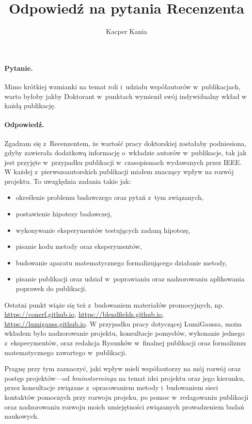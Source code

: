 \documentclass{rebuttal}
\title{Odpowiedź na pytania Recenzenta}
\author{Kacper Kania}
\date{}
\begin{document}
\maketitle

\responsedelimiter

\paragraph{Pytanie.}
  Mimo krótkiej wzmianki na temat roli i~udziału współautorów w~publikacjach,
  warto byłoby jakby Doktorant w~punktach wymienił swój indywidualny wkład w
  każdą publikację.
\paragraph{Odpowiedź.}
  Zgadzam się z~Recenzentem, że wartość pracy doktorskiej zostałaby podniesiona,
  gdyby zawierała dodatkową informację o~wkładzie autorów w~publikacje, tak jak
  jest przyjęte w~przypadku publikacji w~czasopismach wydawanych przez IEEE. W
  każdej z~pierwszoautorskich publikacji miałem znaczący wpływ na rozwój
  projektu. To uwzględnia zadania takie jak:
  \begin{itemize}
    \item określenie problemu badawczego oraz pytań z~tym związanych,
    \item postawienie hipotezy badawczej,
    \item wykonywanie eksperymentów testujących zadaną hipotezę,
    \item pisanie kodu metody oraz eksperymentów,
    \item budowanie aparatu matematycznego formalizującego działanie metody,
    \item pisanie publikacji oraz udział w~poprawianiu oraz nadzorowaniu aplikowania
          poprawek do publikacji.
  \end{itemize}
  Ostatni punkt wiąże się też z~budowaniem
  materiałów promocyjnych, np. \url{https://conerf.github.io},
  \url{https://blendfields.github.io}, \url{https://lumigauss.github.io}. W
  przypadku pracy dotyczącej LumiGaussa, moim wkładem było nadzorowanie
  projektu, konsultacje pomysłów, wykonanie jednego z~eksperymentów, oraz
  redakcja Rysunków w~finalnej publikacji oraz formalizmu matematycznego
  zawartego w~publikacji.

  Pragnę przy tym zaznaczyć, jaki wpływ mieli współautorzy na mój rozwój oraz
  postęp projektów---od \textit{brainstormingu} na temat idei projektu oraz jego
  kierunku, przez konsultacje związane z~opracowaniem metody i~budowaniem sieci
  kontaktów pomocnych przy rozwoju projeku, po pomoc w~redagowaniu publikacji
  oraz nadzorowaniu rozwoju moich umiejętności związanych prowadzeniem badań
  naukowych.
\end{document}
